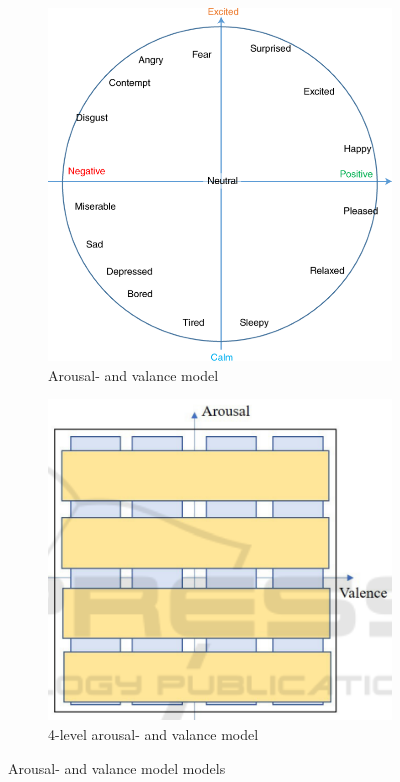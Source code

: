 \begin{figure}
\centering
\begin{subfigure}{.5\textwidth}
  \centering
  \includegraphics[width=.8\linewidth]{figures/valancearousal.png}
  \caption{Arousal- and valance model}
  \label{fig:1}
\end{subfigure}%
\begin{subfigure}{.5\textwidth}
  \centering
  \includegraphics[width=.8\linewidth]{figures/4levelarousal.png}
  \caption{4-level arousal- and valance model}
  \label{fig:2}
\end{subfigure}
\caption{Arousal- and valance model models}
\label{fig:test}
\end{figure}


